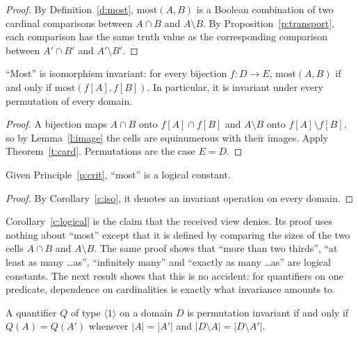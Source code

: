 \documentclass{situationist-preprint}
\begin{document}
\begin{proof}
By Definition~\ref{d:most}, $\mathrm{most}(A, B)$ is a Boolean combination of two cardinal comparisons between $A \cap B$ and $A \setminus B$. By Proposition~\ref{p:transport}, each comparison has the same truth value as the corresponding comparison between $A' \cap B'$ and $A' \setminus B'$.
\end{proof}

\begin{corollary}\label{c:iso}
\enquote{Most} is isomorphism invariant: for every bijection $f\colon D \to E$, $\mathrm{most}(A, B)$ if and only if $\mathrm{most}(f[A], f[B])$. In particular, it is invariant under every permutation of every domain.
\end{corollary}

\begin{proof}
A bijection maps $A \cap B$ onto $f[A] \cap f[B]$ and $A \setminus B$ onto $f[A] \setminus f[B]$, so by Lemma~\ref{l:image} the cells are equinumerous with their images. Apply Theorem~\ref{t:card}. Permutations are the case $E = D$.
\end{proof}

\begin{corollary}\label{c:logical}
Given Principle~\ref{p:crit}, \enquote{most} is a logical constant.
\end{corollary}

\begin{proof}
By Corollary~\ref{c:iso}, it denotes an invariant operation on every domain.
\end{proof}

Corollary~\ref{c:logical} is the claim that the received view denies. Its proof uses nothing about \enquote{most} except that it is defined by comparing the sizes of the two cells $A \cap B$ and $A \setminus B$. The same proof shows that \enquote{more than two thirds}, \enquote{at least as many \ldots as}, \enquote{infinitely many} and \enquote{exactly as many \ldots as} are logical constants. The next result shows that this is no accident: for quantifiers on one predicate, dependence on cardinalities is exactly what invariance amounts to.

\begin{theorem}\label{t:char}
A quantifier $Q$ of type $\langle 1\rangle$ on a domain $D$ is permutation invariant if and only if $Q(A) = Q(A')$ whenever $|A| = |A'|$ and $|D \setminus A| = |D \setminus A'|$.
\end{theorem}
\end{document}
